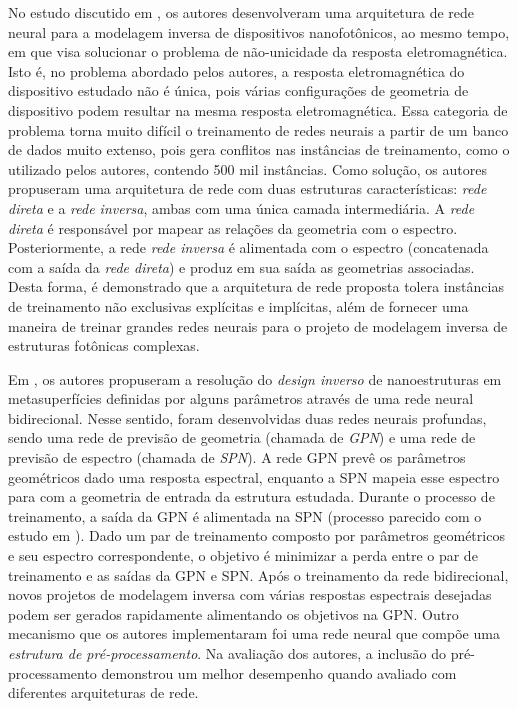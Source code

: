 No estudo discutido em \cite{liu2018training}, os autores desenvolveram uma arquitetura de rede neural para a modelagem inversa de dispositivos nanofotônicos, ao mesmo tempo, em que visa solucionar o problema de não-unicidade da resposta eletromagnética. Isto é, no problema abordado pelos autores, a resposta eletromagnética do dispositivo estudado não é única, pois várias configurações de geometria de dispositivo podem resultar na mesma resposta eletromagnética. Essa categoria de problema torna muito difícil o treinamento de redes neurais a partir de um banco de dados muito extenso, pois gera conflitos nas instâncias de treinamento, como o utilizado pelos autores, contendo 500 mil instâncias. Como solução, os autores propuseram uma arquitetura de rede com duas estruturas características: \textit{rede direta} e a \textit{rede inversa}, ambas com uma única camada intermediária. A \textit{rede direta} é responsável por mapear as relações da geometria com o espectro. Posteriormente, a rede \textit{rede inversa} é alimentada com o espectro (concatenada com a saída da \textit{rede direta}) e produz em sua saída as geometrias associadas. Desta forma, é demonstrado que a arquitetura de rede proposta tolera instâncias de treinamento não exclusivas explícitas e implícitas, além de fornecer uma maneira de treinar grandes redes neurais para o projeto de modelagem inversa de estruturas fotônicas complexas.

Em \cite{malkiel2017deep}, os autores propuseram a resolução do \textit{design inverso} de nanoestruturas em metasuperfícies definidas por alguns parâmetros através de uma rede neural bidirecional. Nesse sentido, foram desenvolvidas duas redes neurais profundas, sendo uma rede de previsão de geometria (chamada de \textit{GPN}) e uma rede de previsão de espectro (chamada de \textit{SPN}). A rede GPN prevê os parâmetros geométricos dado uma resposta espectral, enquanto a SPN mapeia esse espectro para com a geometria de entrada da estrutura estudada. Durante o processo de treinamento, a saída da GPN é alimentada na SPN (processo parecido com o estudo em \cite{liu2018training}). Dado um par de treinamento composto por parâmetros geométricos e seu espectro correspondente, o objetivo é minimizar a perda entre o par de treinamento e as saídas da GPN e SPN. Após o treinamento da rede bidirecional, novos projetos de modelagem inversa com várias respostas espectrais desejadas podem ser gerados rapidamente alimentando os objetivos na GPN. Outro mecanismo que os autores implementaram foi uma rede neural que compõe uma \textit{estrutura de pré-processamento}. Na avaliação dos autores, a inclusão do pré-processamento demonstrou um melhor desempenho quando avaliado com diferentes arquiteturas de rede.

